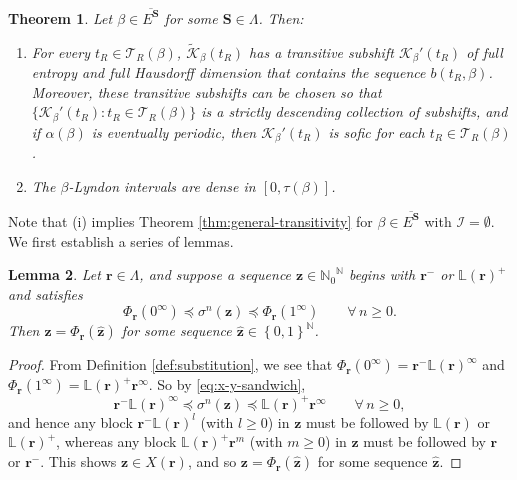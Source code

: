 \documentclass[11pt]{amsart}
\newtheorem{theorem}{Theorem}[section]
\newtheorem{lemma}[theorem]{Lemma}
\theoremstyle{definition}
\theoremstyle{remark}
\numberwithin{equation}{section}
\newcommand{\N}{\ensuremath{\mathbb{N}}}
\renewcommand{\L}{\ensuremath{\mathbb{L}}}
\newcommand{\BB}{\mathscr{B}}
\newcommand{\EE}{\mathscr{E}}
\newcommand{\Kt}{\widetilde{\mathcal{K}}}
\newcommand{\s}{ {\mathbf{s}}}
\newcommand{\cs}{ {\mathbf{S}}}
\renewcommand{\r}{ {\mathbf{r}}}
\newcommand{\z}{\mathbf{z}}
\newcommand{\set}[1]{\left\{#1\right\}}
\newcommand{\f}{\infty}
\newcommand{\al}{\alpha}
\newcommand{\lle}{\preccurlyeq}
\newcommand{\si}{\sigma}
\newcommand{\La}{\Lambda}
\begin{document}
\begin{theorem} \label{thm:beta-in-relative-exceptional-set}
Let $\beta\in \overline{E^\cs}$ for some $\cs\in\La$. Then:
\begin{enumerate}[{\rm(i)}]
\item For every $t_R\in\mathcal{T}_R(\beta)$, $\Kt_\beta(t_R)$ has a transitive subshift $\mathcal{K}_\beta'(t_R)$ of full entropy and full Hausdorff dimension that contains the sequence $b(t_R,\beta)$. Moreover, these transitive subshifts can be chosen so that $\{\mathcal{K}_\beta'(t_R): t_R\in\mathcal{T}_R(\beta)\}$ is a strictly descending collection of subshifts, and if $\al(\beta)$ is eventually periodic, then $\mathcal{K}_\beta'(t_R)$ is sofic for each $t_R\in\mathcal{T}_R(\beta)$.
\item The $\beta$-Lyndon intervals are dense in $[0,\tau(\beta)]$.
\end{enumerate}
\end{theorem}

Note that (i) implies Theorem \ref{thm:general-transitivity} for $\beta\in\overline{E^\cs}$ {with $\mathcal I=\emptyset$}.
We first establish a series of lemmas.

\begin{lemma} \label{lem:four-blocks}
Let $\r\in\La$, and suppose a sequence $\z\in{\N_0}^\N$ begins with $\r^-$ or $\L(\r)^+$ and satisfies
\begin{equation} \label{eq:x-y-sandwich}
\Phi_\r(0^\f)\lle \si^n(\z)\lle \Phi_\r(1^\f)\qquad\forall\,n\geq 0.
\end{equation}
Then  $\z=\Phi_\r(\hat{\z})$ for some sequence $\hat{\z}\in\set{0,1}^\N$.
\end{lemma}
 
\begin{proof}
From Definition \ref{def:substitution}, we see that $\Phi_\r(0^\f)=\r^-\L(\r)^\f$ and $\Phi_\r(1^\f)=\L(\r)^+\r^\f$. So by \eqref{eq:x-y-sandwich},
\[
\r^-\L(\r)^\f \lle \sigma^n(\z)\lle \L(\r)^+\r^\f \qquad \forall\, n\geq 0,
\]
and hence any block $\r^-\L(\r)^l$ (with $l\geq 0$) in $\z$ must be followed by $\L(\r)$ or $\L(\r)^+$, whereas any block $\L(\r)^+\r^m$ (with $m\geq 0$) in $\z$ must be followed by $\r$ or $\r^-$. This shows $\z\in X(\r)$, and so $\z=\Phi_\r(\hat{\z})$ for some sequence $\hat{\z}$.
\end{proof}
 
\end{document}
